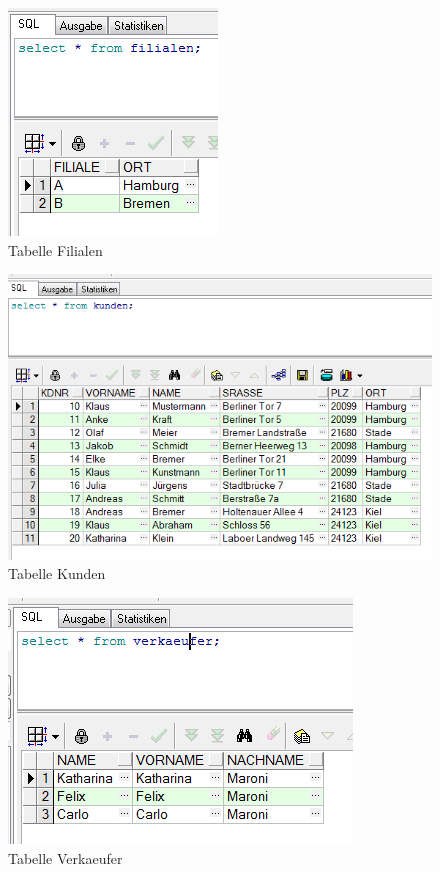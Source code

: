 \documentclass{scrreprt}
\begin{document}
\begin{figure}
  \centering
  \includegraphics{screenshots/filialen.png}
  \caption{Tabelle Filialen}
\end{figure}

\begin{figure}
  \centering
  \includegraphics{screenshots/kunden.png}
  \caption{Tabelle Kunden}
\end{figure}

\begin{figure}
  \centering
  \includegraphics{screenshots/verkaeufer.png}
  \caption{Tabelle Verkaeufer}
\end{figure}
\end{document}
